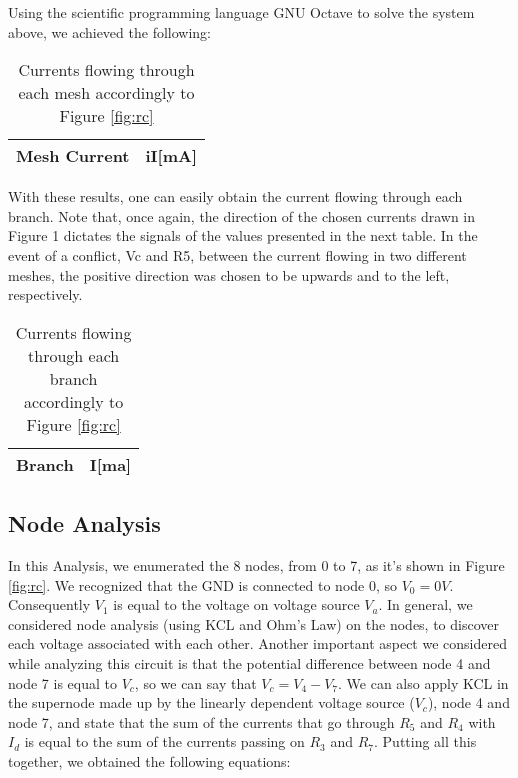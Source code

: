Using the scientific programming language GNU Octave to solve the system above, we achieved the following:

\begin{table}[h]
  \centering
  \begin{tabular}{|l|r|}
    \hline    
    {\bf Mesh Current} & {\bf iI[mA]} \\ \hline
    
 \end{tabular}
 \caption{Currents flowing through each mesh accordingly to Figure \ref{fig:rc}}
  \label{tab:op}
\end{table}

With these results, one can easily obtain the current flowing through each branch. Note that, once again, the direction of the chosen currents drawn in Figure 1 dictates the signals of the values presented in the next table. In the event of a conflict, Vc and R5, between the current flowing in two different meshes, the positive direction was chosen to be upwards and to the left, respectively.

\begin{table}[h]
  \centering
  \begin{tabular}{|l|r|}
    \hline    
    {\bf Branch} & {\bf I[ma]} \\ \hline
    
 \end{tabular}
 \caption{Currents flowing through each branch accordingly to Figure \ref{fig:rc}}
  \label{tab:op}
  \label{tab:op}
\end{table}


\subsection{Node Analysis}
In this Analysis, we enumerated the 8 nodes, from 0 to 7, as it's shown in Figure \ref{fig:rc}. We recognized that the GND is connected to node 0, so $V_{0}=0V$. Consequently $V_1$ is equal to the voltage on voltage source $V_a$. In general, we considered node analysis (using KCL and Ohm's Law) on the nodes, to discover each voltage associated with each other. Another important aspect we considered while analyzing this circuit is that the potential difference between node 4 and node 7 is equal to $V_c$, so we can say that $V_c=V_4-V_7$. We can also apply KCL in the supernode made up by the linearly dependent voltage source ($V_c$), node 4 and node 7, and state that the sum of the currents that go through $R_5$ and $R_4$ with $I_d$ is equal to the sum of the currents passing on $R_3$ and $R_7$.
Putting all this together, we obtained the following equations:

